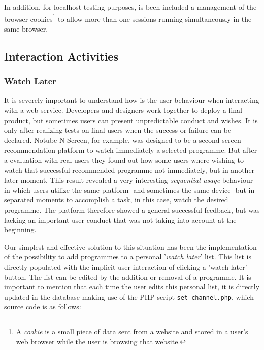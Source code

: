 \documentclass{acm_proc_article-sp}
\begin{document}
In addition, for localhost testing purposes, is been included a management of the browser cookies\footnote{A \textit{cookie} is a small piece of data sent from a website and stored in a user's web browser while the user is browsing that website.} to allow more than one sessions running simultaneously in the same browser.

\subsection{Interaction Activities}
\subsubsection{Watch Later} \label{watchlater}
It is severely important to understand how is the user behaviour when interacting with a web service. Developers and designers work together to deploy a final product, but sometimes users can present unpredictable conduct and wishes\cite{norman2002design}. It is only after realizing tests on final users when the success or failure can be declared. Notube N-Screen, for example, was designed to be a second screen recommendation platform to watch immediately a selected programme. But after a evaluation with real users they found out how some users where wishing to watch that successful recommended programme not immediately, but in another later moment. This result revealed a very interesting \textit{sequential usage} behaviour in which users utilize the same platform -and sometimes the same device- but in separated moments to accomplish a task, in this case, watch the desired programme. The platform therefore showed a general successful feedback, but was lacking an important user conduct that was not taking into account at the beginning. 

Our simplest and effective solution to this situation\cite{krug2014don} has been the implementation of the possibility to add programmes to a personal '\textit{watch later}' list. This list is directly populated with the implicit user interaction of clicking a 'watch later' button. The list can be edited by the addition or removal of a programme. It is important to mention that each time the user edits this personal list, it is directly updated in the database making use of the PHP script \texttt{set\_channel.php}, which source code is as follows:
\end{document}
